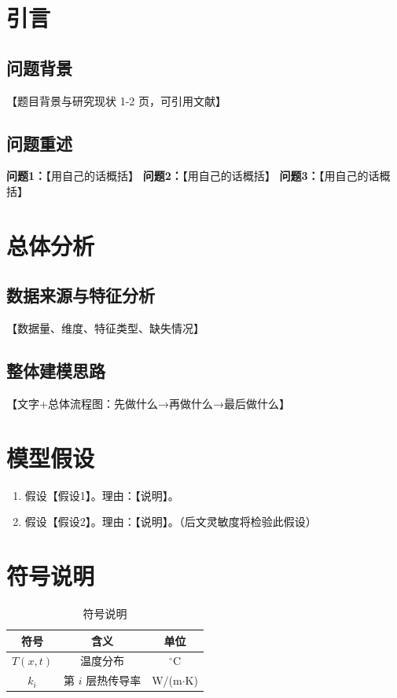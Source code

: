 
\section{引言}
\subsection{问题背景}
【题目背景与研究现状 1-2 页，可引用文献】
\subsection{问题重述}
\textbf{问题1：}【用自己的话概括】
\textbf{问题2：}【用自己的话概括】
\textbf{问题3：}【用自己的话概括】

\section{总体分析}
\subsection{数据来源与特征分析}
【数据量、维度、特征类型、缺失情况】
\subsection{整体建模思路}
【文字+总体流程图：先做什么→再做什么→最后做什么】

\section{模型假设}
\begin{enumerate}
  \item 假设【假设1】。理由：【说明】。
  \item 假设【假设2】。理由：【说明】。（后文灵敏度将检验此假设）
\end{enumerate}

\section{符号说明}
\begin{table}[ht]
  \centering
  \caption{符号说明}
  \begin{tabular}{ccc}
    \toprule
    符号 & 含义 & 单位 \\
    \midrule
    $T(x,t)$ & 温度分布 & $^\circ$C \\
    $k_i$ & 第 $i$ 层热传导率 & W/(m$\cdot$K) \\
    \bottomrule
  \end{tabular}
\end{table}

